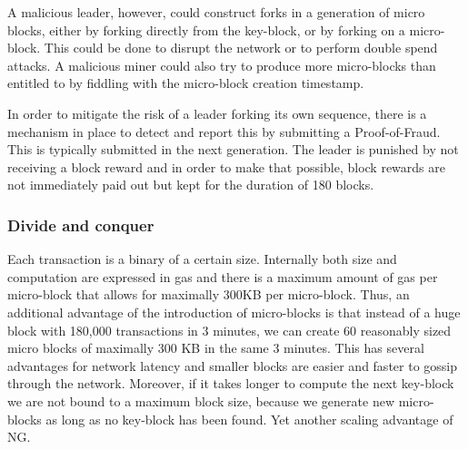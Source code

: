 A malicious leader, however, could construct forks in a generation of micro
blocks, either by forking directly from the key-block, or by forking
on a micro-block. This could be done to disrupt the network or to
perform double spend attacks. A malicious miner could also try to
produce more micro-blocks than entitled to by fiddling with the
micro-block creation timestamp.

In order to mitigate the risk of a leader forking its own sequence,
there is a mechanism in place to detect and report this by submitting
a Proof-of-Fraud. This is typically submitted in the next
generation. The leader is punished by not receiving a block reward and
in order to make that possible, block rewards are not immediately paid out but kept for
the duration of 180 blocks.

\subsubsection{Divide and conquer}

Each transaction is a binary of a certain size. Internally both size
and computation are expressed in gas and there is a maximum amount of
gas per micro-block that allows for maximally 300KB per micro-block.
Thus, an additional advantage of the introduction of micro-blocks is that
instead of a huge block with 180,000 transactions in 3 minutes, we can create 60
reasonably sized micro blocks of maximally 300 KB  in the same 3
minutes. This has several advantages for network latency and
smaller blocks are easier and faster to gossip through the
network. Moreover, if it takes longer to compute the next key-block we
are not bound to a maximum block size, because we generate new
micro-blocks as long as no key-block has been found. Yet another
scaling advantage of NG.
